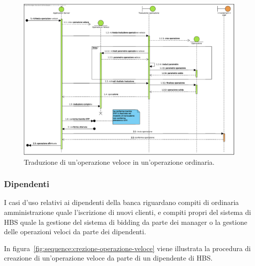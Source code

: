 \begin{figure}[h]
    \centering
    \includegraphics[height=\textwidth, angle=90]{Images/sequence/Operazione_Veloce.eps}
    \caption{Traduzione di un'operazione veloce in un'operazione ordinaria.}
    \label{fig:sequence:operazione-veloce}
\end{figure}

\subsubsection{Dipendenti}

I casi d'uso relativi ai dipendenti della banca riguardano compiti di ordinaria amministrazione quale l'iscrizione di nuovi clienti, e compiti propri del sistema di HBS quale la gestione del sistema di bidding da parte dei manager o la gestione delle operazioni veloci da parte dei dipendenti.

In figura~\ref{fig:sequence:crezione-operazione-veloce} viene illustrata la procedura di creazione di un'operazione veloce da parte di un dipendente di HBS.

